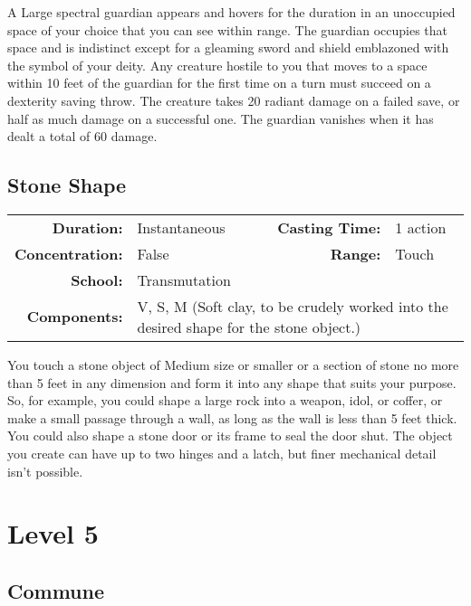 \documentclass[a5paper, 12pt]{memoir}
\begin{document}
\vspace{1\baselineskip}\noindent A Large spectral guardian appears and hovers for the duration in an unoccupied space of your choice that you can see within range. The guardian occupies that space and is indistinct except for a gleaming sword and shield emblazoned with the symbol of your deity. Any creature hostile to you that moves to a space within 10 feet of the guardian for the first time on a turn must succeed on a dexterity saving throw. The creature takes 20 radiant damage on a failed save, or half as much damage on a successful one. The guardian vanishes when it has dealt a total of 60 damage.

\newpage
\section*{Stone Shape}

{
\small\centering\vspace{-6pt}
\begin{tabular}{rlrl}
\toprule

\textbf{Duration:} & Instantaneous &
\textbf{Casting Time:} & 1 action \\
\textbf{Concentration:} & False &
\textbf{Range:} & Touch \\
\textbf{School:} & Transmutation \\
\textbf{Components:} & \multicolumn{3}{p{0.7\textwidth}}{V, S, M (Soft clay, to be crudely worked into the desired shape for the stone object.)}\\

\bottomrule
\end{tabular}
}

\vspace{1\baselineskip}\noindent You touch a stone object of Medium size or smaller or a section of stone no more than 5 feet in any dimension and form it into any shape that suits your purpose. So, for example, you could shape a large rock into a weapon, idol, or coffer, or make a small passage through a wall, as long as the wall is less than 5 feet thick. You could also shape a stone door or its frame to seal the door shut. The object you create can have up to two hinges and a latch, but finer mechanical detail isn't possible.

\newpage
\chapter*{Level 5} 
\section*{Commune}
\end{document}
